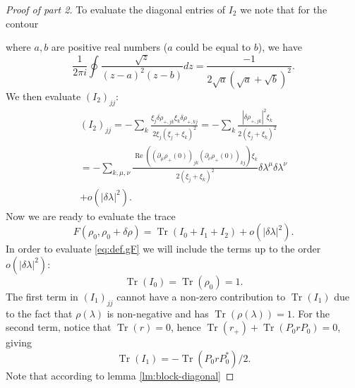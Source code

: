 \documentclass[
  american,aps,pra,reprint,floatfix,nofootinbib,superscriptaddress
]{revtex4-2}
\DeclareMathOperator{\Tr}{Tr}
\DeclareMathOperator{\real}{Re}
\newcommand{\abs}[1]{\left|#1\right|}
\begin{document}
\begin{proof}[Proof of part 2]
  To evaluate the diagonal entries of $I_2$ we note that for the contour
  \begin{center}
  \end{center}
  where $a,b$ are positive real numbers ($a$ could be equal to $b$),
  we have
  \begin{equation}
    \frac1{2\pi i} \oint \frac{\sqrt{z}}{(z-a)^2(z-b)} dz = \frac{-1}{2\sqrt{a}(\sqrt{a} + \sqrt{b})^2}.
  \end{equation}
  We then evaluate $(I_2)_{jj}$:
  \begin{multline}
    \label{eq:I2jj}
    (I_2)_{jj} = -\sum_k \frac{\xi_j \delta \rho_{{+},jk}
      \xi_k \delta \rho_{{+},kj}}{2\xi_j (\xi_j + \xi_k)^2}
    = -\sum_k \frac{\abs{\delta \rho_{{+},jk}}^2 \xi_k}{2(\xi_j + \xi_k)^2} \\
    = -\sum_{k,\mu,\nu} \frac{
        \real\left(
          (\partial_\mu\rho_{+}(0))_{jk}(\partial_\nu\rho_{+}(0))_{kj}
        \right) \xi_k
      }{2(\xi_j + \xi_k)^2} \delta\lambda^\mu\delta\lambda^\nu \\
      + o(\abs{\delta \lambda}^2).
  \end{multline}
  Now we are ready to evaluate the trace
  \begin{equation}
    F(\rho_0, \rho_0 + \delta \rho) =
      \Tr(I_0 + I_1 + I_2) + o(\abs{\delta\lambda}^2).
  \end{equation}
  In order to evaluate \eqref{eq:def.gF} we will include the terms up to
  the order $o(\abs{\delta \lambda}^2)$:
  \begin{equation}
    \Tr(I_0) = \Tr(\rho_0) = 1.
  \end{equation}
  The first term in $(I_1)_{jj}$ cannot have a non-zero contribution to
  $\Tr(I_1)$ due to the fact that $\rho(\lambda)$ is non-negative and
  has $\Tr(\rho(\lambda)) = 1$. For the second term, notice that $\Tr(r) = 0$,
  hence $\Tr(r_{+}) + \Tr(P_0 r P_0) = 0$, giving
  \begin{equation}
    \label{eq:TrI1}
    \Tr(I_1) = - \Tr(P_0 r P_0^*) / 2.
  \end{equation}
  Note that according to lemma \ref{lm:block-diagonal}

\end{proof}
\end{document}
